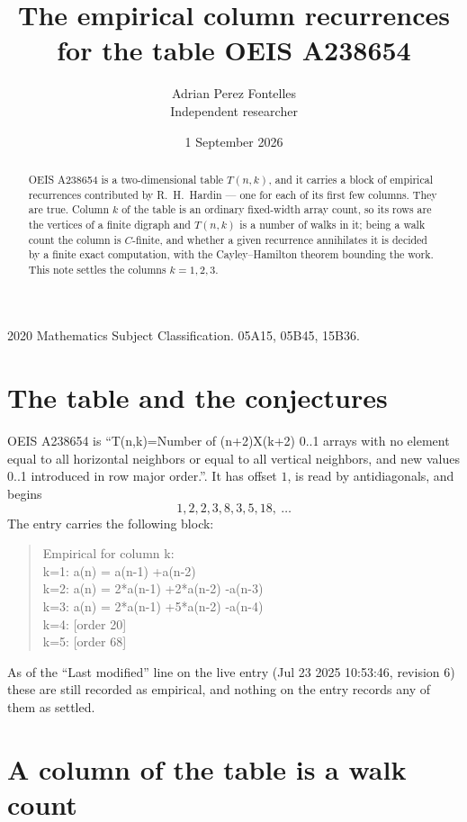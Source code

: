 \documentclass[11pt,a4paper]{article}
\title{The empirical column recurrences for the table OEIS A238654}
\author{Adrian Perez Fontelles\\ \small Independent researcher}
\date{1 September 2026}
\theoremstyle{plain}
\theoremstyle{definition}
\begin{document}
\maketitle

\begin{abstract}
OEIS A238654 is a two-dimensional table $T(n,k)$, and it carries a block of empirical
recurrences contributed by R.~H.~Hardin --- one for each of its first few columns. They are
true. Column $k$ of the table is an ordinary fixed-width array count, so its rows are the
vertices of a finite digraph and $T(n,k)$ is a number of walks in it; being a walk count the
column is $C$-finite, and whether a given recurrence annihilates it is decided by a finite
exact computation, with the Cayley--Hamilton theorem bounding the work. This note settles the columns $k=1, 2, 3$.
\end{abstract}

\noindent\small 2020 Mathematics Subject Classification. 05A15, 05B45, 15B36.\normalsize

\section{The table and the conjectures}

OEIS A238654 is ``T(n,k)=Number of (n+2)X(k+2) 0..1 arrays with no element equal to all horizontal neighbors or equal to all vertical neighbors, and new values 0..1 introduced in row major order.''. It has offset $1$, is
read by antidiagonals, and begins
\[
1, 2, 2, 3, 8, 3, 5, 18,\ \dots
\]
The entry carries the following block:
\begin{quote}\small
Empirical for column k:\\
k=1: a(n) = a(n-1) +a(n-2)\\
k=2: a(n) = 2*a(n-1) +2*a(n-2) -a(n-3)\\
k=3: a(n) = 2*a(n-1) +5*a(n-2) -a(n-4)\\
k=4: [order 20]\\
k=5: [order 68]\\
\end{quote}
As of the ``Last modified'' line on the live entry (Jul 23 2025 10:53:46, revision 6) these are still
recorded as empirical, and nothing on the entry records any of them as settled.

\section{A column of the table is a walk count}
\end{document}
